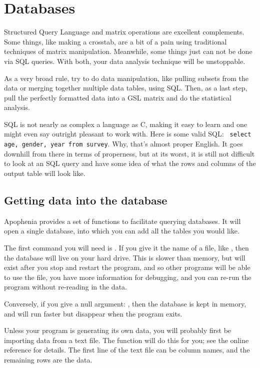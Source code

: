\chapter{Databases} \label{sql}
\setsql %

Structured Query Language and matrix operations are excellent complements. Some things, like
making a crosstab, are a bit of a pain using traditional techniques of
matrix manipulation. Meanwhile, some things just can not be done via SQL
queries. With both, your data analysis technique will be unstoppable.

As a very broad rule, try to do data manipulation, like pulling subsets
from the data or merging together multiple data tables, using SQL. Then,
as a last step, pull the perfectly formatted data into a GSL matrix and
do the statistical analysis. 

SQL is not nearly as complex a language as C, making it easy to learn
and one might even say outright pleasant to work with. Here is some valid SQL: {\tt
select age, gender, year from survey}. Why, that's almost proper English. It
goes downhill from there in terms of properness, but at its worst, it is
still not difficult to look at an SQL query and have some idea of what
the rows and columns of the output table will look like.

\section{Getting data into the database}
Apophenia provides a set of functions to facilitate querying databases.
It will open a single database, into which you can add all the tables you would like.

The first command you will need is . If you give
it the name of a file, like , then the
database will live on your hard drive. This is slower than memory, but
will exist after you stop and restart the program, and so other programs
will be able to use the file, you have more information for debugging,
and you can re-run the program without re-reading in the data.

Conversely, if you give a null argument: ,
then the database is kept in memory, and will run faster but 
disappear when the program exits.


Unless your program is generating its own data, you will probably
first be importing data from a text file.  The 
function will do this for you; see the online reference for details. The
first line of the text file can be column names, and the remaining rows
are the data.


